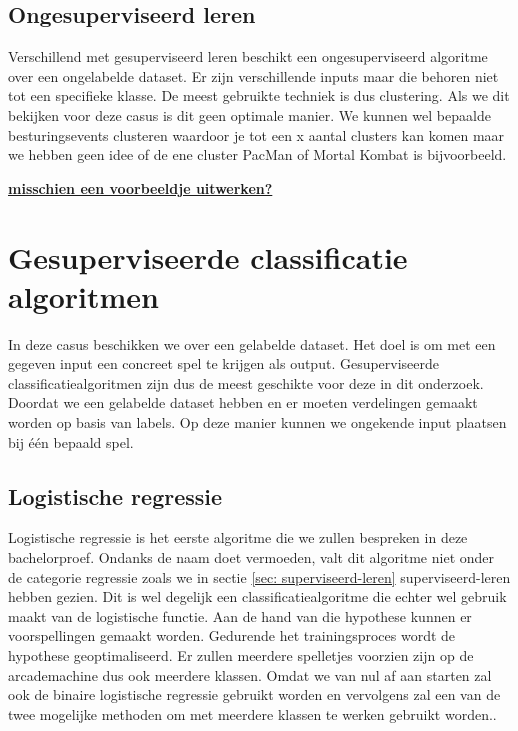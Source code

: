 \subsection*{Ongesuperviseerd leren}
\label{sec: ongesuperviseerd-leren}
Verschillend met gesuperviseerd leren beschikt een ongesuperviseerd algoritme over een ongelabelde dataset. Er zijn verschillende inputs maar die behoren niet tot een specifieke klasse. De meest gebruikte techniek is dus clustering. Als we dit bekijken voor deze casus is dit geen optimale manier. We kunnen wel bepaalde besturingsevents clusteren waardoor je tot een x aantal clusters kan komen maar we hebben geen idee of de ene cluster PacMan of Mortal Kombat is bijvoorbeeld. 


\textbf{\underline{{\Large misschien een voorbeeldje uitwerken? }}}

\section{Gesuperviseerde classificatie algoritmen}
\label{sec:gesuperviseerde-classificatie-algoritmen}

In deze casus beschikken we over een gelabelde dataset. Het doel is om met een gegeven input een concreet spel te krijgen als output. Gesuperviseerde classificatiealgoritmen zijn dus de meest geschikte voor deze in dit onderzoek. Doordat we een gelabelde dataset hebben en er moeten verdelingen gemaakt worden op basis van labels. Op deze manier kunnen we ongekende input plaatsen bij één bepaald spel.


\subsection{Logistische regressie}
\label{sec:logistische-regressie}

Logistische regressie is het eerste algoritme die we zullen bespreken in deze bachelorproef. Ondanks de naam doet vermoeden, valt dit algoritme niet onder de categorie regressie zoals we in sectie \ref{sec: superviseerd-leren} superviseerd-leren hebben gezien. Dit is wel degelijk een classificatiealgoritme die echter wel gebruik maakt van de logistische functie. Aan de hand van die hypothese kunnen er voorspellingen gemaakt worden. Gedurende het trainingsproces wordt de hypothese geoptimaliseerd. Er zullen meerdere spelletjes voorzien zijn op de arcademachine dus ook meerdere klassen. Omdat we van nul af aan starten zal ook de binaire logistische regressie gebruikt worden en vervolgens zal een van de twee mogelijke methoden om met meerdere klassen te werken gebruikt worden.. 

